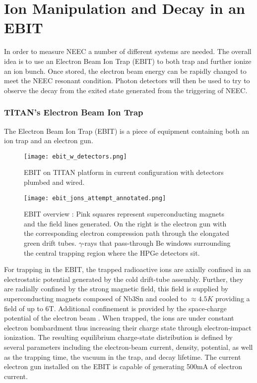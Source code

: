 \documentclass[jon_ringuette_thesis_proposal.tex]{subfiles}
\begin{document}
    \chapter{Ion Manipulation and Decay in an EBIT}
    In order to measure NEEC a number of different systems are needed.
    The overall idea is to use an Electron Beam Ion Trap (EBIT) to both trap and further ionize an ion bunch.
    Once stored, the electron beam energy can be rapidly changed to meet the NEEC resonant condition.
    Photon detectors will then be used to try to observe the decay from the exited state generated from the triggering of NEEC.

    \subsection{TITAN's Electron Beam Ion Trap}
    The Electron Beam Ion Trap (EBIT) is a piece of equipment containing both an ion trap and an electron gun.
    \begin{figure}[H]
        \begin{center}
            \texttt{[image: ebit\_w\_detectors.png]}
        \end{center}
        \caption{EBIT on TITAN platform in current configuration with detectors plumbed and wired.}
        \label{fig:ebit_w_detectors}
    \end{figure}

    \begin{figure}[H]
        \begin{center}
            \texttt{[image: ebit\_jons\_attempt\_annotated.png]}
        \end{center}
        \caption{\small EBIT overview : Pink squares represent superconducting magnets and the field lines generated. On the right is the electron gun with the corresponding electron compression path through the elongated green drift tubes. $\gamma$-rays that pass-through Be windows surrounding the central trapping region where the HPGe detectors sit.}
        \label{fig:ebit_field_overview}
    \end{figure}

    For trapping in the EBIT, the trapped radioactive ions are axially confined in an electrostatic potential generated by the cold drift-tube assembly.
    Further, they are radially confined by the strong magnetic field, this field is supplied by superconducting magnets composed of Nb3Sn and cooled to $\approx4.5K$ providing a field of up to 6T.
    Additional confinement is provided by the space-charge potential of the electron beam \cite{TITAN_EBIT_2010}.
    When trapped, the ions are under constant electron bombardment thus increasing their charge state through electron-impact ionization.
    The resulting equilibrium charge-state distribution is defined by several parameters including the electron-beam current, density, potential, as well as the trapping time, the vacuum in the trap, and decay lifetime.
    The current electron gun installed on the EBIT is capable of generating 500mA of electron current.
\end{document}

